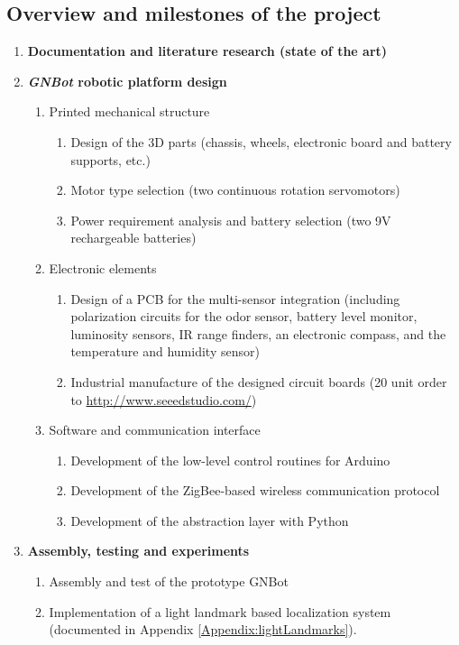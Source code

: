 \subsection{Overview and milestones of the project}
\begin{enumerate}
	\item \textbf{Documentation and literature research (state of the art)}
	\item \textbf{\emph{GNBot} robotic platform design}
	\begin{enumerate}
		\item Printed mechanical structure
		\begin{enumerate}
			\item Design of the 3D parts (chassis, wheels, electronic board and battery supports, etc.)
			\item Motor type selection (two continuous rotation servomotors)
			\item Power requirement analysis and battery selection (two 9V rechargeable batteries)
		\end{enumerate}
		\item Electronic elements
		\begin{enumerate}
			\item Design of a PCB for the multi-sensor integration (including polarization circuits for the odor sensor, battery level monitor, luminosity sensors, IR range finders, an electronic compass, and the temperature and humidity sensor)
			\item Industrial manufacture of the designed circuit boards (20 unit order to \url{http://www.seeedstudio.com/})
		\end{enumerate}
		\item Software and communication interface
		\begin{enumerate}
			\item Development of the low-level control routines for Arduino
			\item Development of the ZigBee-based wireless communication protocol
			\item Development of the abstraction layer with Python
		\end{enumerate}
	\end{enumerate}
	\item \textbf{Assembly, testing and experiments}
	\begin{enumerate}
		\item Assembly and test of the prototype GNBot
		\item Implementation of a light landmark based localization system (documented in Appendix \ref{Appendix:lightLandmarks}).

\end{enumerate}
\end{enumerate}

